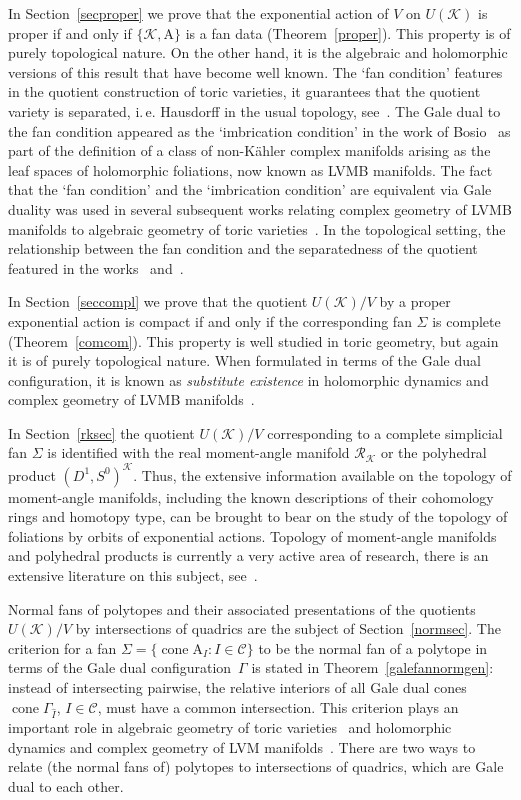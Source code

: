 \documentclass[a4paper]{amsart}
\theoremstyle{definition}
\theoremstyle{remark}
\numberwithin{equation}{section}
\def\sK{\mathcal K}
\def\cone{\mathop{\mathrm{cone}}}
\newcommand{\<}{\langle}
\renewcommand{\>}{\rangle}
\begin{document}
In Section~\ref{secproper} we prove that the exponential action of $V$ on $U(\sK)$ is proper if and only if $\{\mathcal K,\mathrm A\}$ is a fan data (Theorem~\ref{proper}). This property is of purely topological nature. On the other hand, it is the algebraic and holomorphic versions of this result that have become well known. The `fan condition' features in the quotient construction of toric varieties, it guarantees that the quotient variety is separated, i.\,e. Hausdorff in the usual topology, see~\cite[Theorem~5.1.11]{c-l-s11}. The Gale dual to the fan condition appeared as the `imbrication condition' in the work of Bosio~\cite{bosi01} as part of the definition of a class of non-K\"ahler complex manifolds arising as the leaf spaces of holomorphic foliations, now known as LVMB manifolds.  The fact that the `fan condition' and the `imbrication condition' are equivalent via Gale duality was used in several subsequent works relating complex geometry of LVMB manifolds to algebraic geometry of toric varieties~\cite{me-ve04,tamb12,batt13,ba-za15,ba-za17}. In the topological setting, the relationship between the fan condition and the separatedness of the quotient featured in the works~\cite{i-f-m13} and~\cite{ishi19}.

In Section~\ref{seccompl} we prove that the quotient $U(\sK)/V$ by a proper exponential action is compact if and only if the corresponding fan $\Sigma$ is complete (Theorem~\ref{comcom}). This property is well studied in toric geometry, but again it is of purely topological nature. When formulated in terms of the Gale dual configuration, it is known as \emph{substitute existence} in holomorphic dynamics and complex geometry of LVMB manifolds~\cite{bosi01,batt13}.

In Section~\ref{rksec} the quotient $U(\sK)/V$ corresponding to a complete simplicial fan $\Sigma$ is identified with the real moment-angle manifold $\mathcal R_{\mathcal K}$ or the polyhedral product $(D^1,S^0)^\sK$. Thus, the extensive information available on the topology of moment-angle manifolds, including the known descriptions of their cohomology rings and homotopy type, can be brought to bear on the study of the topology of foliations by orbits of exponential actions.
Topology of moment-angle manifolds and polyhedral products is currently a very active area of research, there is an extensive literature on this subject, see~\cite{bu-pa15,b-b-c20}.

Normal fans of polytopes and their associated presentations of the quotients $U(\sK)/V$ by intersections of quadrics are the subject of Section~\ref{normsec}. The criterion for a fan $\Sigma=\{\cone\mathrm A_I\colon I\in\mathcal C\}$ to be the normal fan of a polytope in terms of the Gale dual configuration~$\Gamma$ is stated in Theorem~\ref{galefannormgen}: instead of intersecting pairwise, the relative interiors of all Gale dual cones $\cone\Gamma_{\widehat I}$, $I\in\mathcal C$, must have a common intersection. This criterion plays an important role in algebraic geometry of toric varieties~\cite{od-pa91} and holomorphic dynamics and complex geometry of LVM manifolds~\cite{lo-ve97,meer00}. 
There are two ways to relate (the normal fans of) polytopes to intersections of quadrics, which are Gale dual to each other. 
\end{document}
